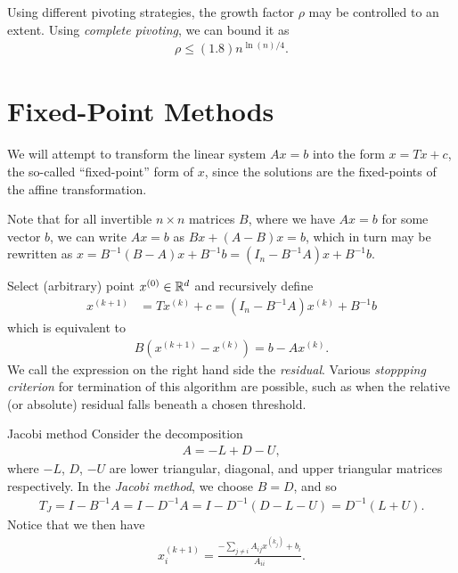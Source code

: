 \begin{rmk}
    Using different pivoting strategies, the growth factor $\rho$ may be controlled to an extent. Using \emph{complete pivoting}, we can bound it as
    \begin{align*}
        \rho \leq (1.8)n^{\ln(n)/4}.
    \end{align*}
\end{rmk}

\section{Fixed-Point Methods}

We will attempt to transform the linear system $Ax = b$ into the form $x = Tx + c$, the so-called ``fixed-point'' form of $x$, since the solutions are the fixed-points of the affine transformation.

Note that for all invertible $n \times n$ matrices $B$, where we have $Ax = b$ for some vector $b$, we can write $Ax = b$ as $Bx + (A - B)x = b$, which in turn may be rewritten as $x = B^{-1}(B-A)x + B^{-1}b = (I_n - B^{-1}A)x + B^{-1}b$.

\begin{defn}
    Select (arbitrary) point $x^{(0)} \in \mathbb{R}^{d}$ and recursively define
    \begin{align*}
        x^{(k+1)} &= Tx^{(k)} + c = \left(I_n - B^{-1}A\right)x^{(k)} + B^{-1}b
    \end{align*}
    which is equivalent to
    \begin{align*}
        B\left(x^{(k+1)} - x^{(k)}\right) = b - Ax^{(k)}.
    \end{align*}
    We call the expression on the right hand side the \emph{residual}. Various \emph{stoppping criterion} for termination of this algorithm are possible, such as when the relative (or absolute) residual falls beneath a chosen threshold.
\end{defn}

\begin{defn}{Jacobi method}\proofbreak
    Consider the decomposition
    \begin{align*}
        A = -L + D - U,
    \end{align*}
    where $-L$, $D$, $-U$ are lower triangular, diagonal, and upper triangular matrices respectively. In the \emph{Jacobi method}, we choose $B = D$, and so
    \begin{align*}
        T_{J} = I - B^{-1}A = I - D^{-1}A = I-D^{-1}(D - L - U) = D^{-1}(L + U).
    \end{align*}
    Notice that we then have
    \begin{align*}
        x^{(k + 1)}_{i} = \frac{-\sum_{j\neq i}A_{ij}x^{(k_j)} + b_i}{A_{ii}}.
    \end{align*}
\end{defn}

